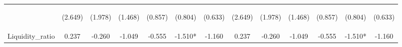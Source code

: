 \documentclass[]{article}
\begin{document}
\begin{center}
\begin{tabular}{lcccccccccccc}
\vspace{4pt} & \begin{footnotesize}(2.649)\end{footnotesize} & \begin{footnotesize}(1.978)\end{footnotesize} & \begin{footnotesize}(1.468)\end{footnotesize} & \begin{footnotesize}(0.857)\end{footnotesize} & \begin{footnotesize}(0.804)\end{footnotesize} & \begin{footnotesize}(0.633)\end{footnotesize} & \begin{footnotesize}(2.649)\end{footnotesize} & \begin{footnotesize}(1.978)\end{footnotesize} & \begin{footnotesize}(1.468)\end{footnotesize} & \begin{footnotesize}(0.857)\end{footnotesize} & \begin{footnotesize}(0.804)\end{footnotesize} & \begin{footnotesize}(0.633)\end{footnotesize} \\
Liquidity\_ratio & 0.237 & -0.260 & -1.049 & -0.555 & -1.510* & -1.160 & 0.237 & -0.260 & -1.049 & -0.555 & -1.510* & -1.160 \\

\end{tabular}
\end{center}
\end{document}
